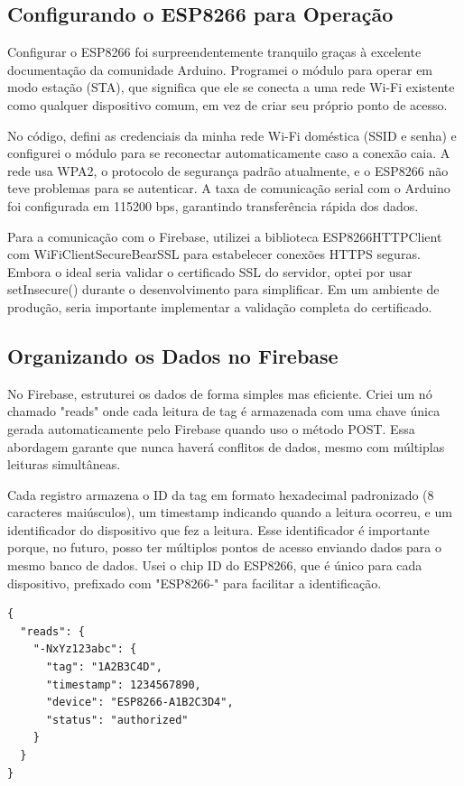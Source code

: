 \subsection{Configurando o ESP8266 para Operação}

Configurar o ESP8266 foi surpreendentemente tranquilo graças à excelente documentação da comunidade Arduino. Programei o módulo para operar em modo estação (STA), que significa que ele se conecta a uma rede Wi-Fi existente como qualquer dispositivo comum, em vez de criar seu próprio ponto de acesso.

No código, defini as credenciais da minha rede Wi-Fi doméstica (SSID e senha) e configurei o módulo para se reconectar automaticamente caso a conexão caia. A rede usa WPA2, o protocolo de segurança padrão atualmente, e o ESP8266 não teve problemas para se autenticar. A taxa de comunicação serial com o Arduino foi configurada em 115200 bps, garantindo transferência rápida dos dados.

Para a comunicação com o Firebase, utilizei a biblioteca ESP8266HTTPClient com WiFiClientSecureBearSSL para estabelecer conexões HTTPS seguras. Embora o ideal seria validar o certificado SSL do servidor, optei por usar setInsecure() durante o desenvolvimento para simplificar. Em um ambiente de produção, seria importante implementar a validação completa do certificado.

\subsection{Organizando os Dados no Firebase}

No Firebase, estruturei os dados de forma simples mas eficiente. Criei um nó chamado "reads" onde cada leitura de tag é armazenada com uma chave única gerada automaticamente pelo Firebase quando uso o método POST. Essa abordagem garante que nunca haverá conflitos de dados, mesmo com múltiplas leituras simultâneas.

Cada registro armazena o ID da tag em formato hexadecimal padronizado (8 caracteres maiúsculos), um timestamp indicando quando a leitura ocorreu, e um identificador do dispositivo que fez a leitura. Esse identificador é importante porque, no futuro, posso ter múltiplos pontos de acesso enviando dados para o mesmo banco de dados. Usei o chip ID do ESP8266, que é único para cada dispositivo, prefixado com "ESP8266-" para facilitar a identificação.

\begin{verbatim}
{
  "reads": {
    "-NxYz123abc": {
      "tag": "1A2B3C4D",
      "timestamp": 1234567890,
      "device": "ESP8266-A1B2C3D4",
      "status": "authorized"
    }
  }
}
\end{verbatim}

